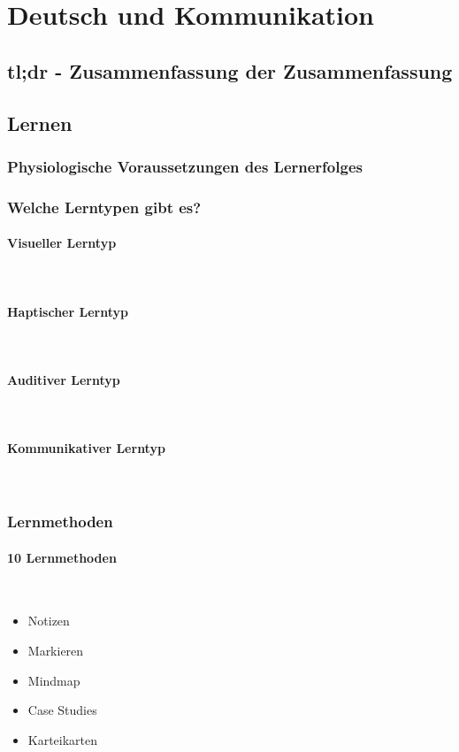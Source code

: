 \section{Deutsch und Kommunikation}


\subsection{tl;dr - Zusammenfassung der Zusammenfassung}

\subsection{Lernen}


\subsubsection{Physiologische Voraussetzungen des Lernerfolges}

\subsubsection{Welche Lerntypen gibt es?}

\paragraph{Visueller Lerntyp}~\\
\paragraph{Haptischer Lerntyp}~\\
\paragraph{Auditiver Lerntyp}~\\
\paragraph{Kommunikativer Lerntyp}~\\

\subsubsection{Lernmethoden}

\paragraph{10 Lernmethoden}~\\
\begin{itemize}
	\item Notizen
	\item Markieren
	\item Mindmap
	\item Case Studies
	\item Karteikarten
\end{itemize}

